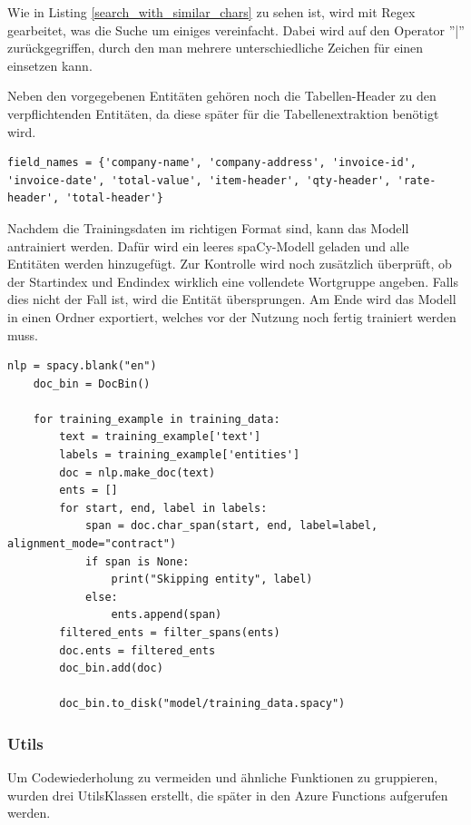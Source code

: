 Wie in Listing \ref{search_with_similar_chars} zu sehen ist, wird mit Regex gearbeitet, was die Suche um einiges vereinfacht. Dabei wird auf den Operator ''|'' zurückgegriffen, durch den man mehrere unterschiedliche Zeichen für einen einsetzen kann.

Neben den vorgegebenen Entitäten gehören noch die Tabellen-Header zu den verpflichtenden Entitäten, da diese später für die Tabellenextraktion benötigt wird. 

\begin{lstlisting}[caption={Verpflichtende Entitäten}]
    field_names = {'company-name', 'company-address', 'invoice-id', 'invoice-date', 'total-value', 'item-header', 'qty-header', 'rate-header', 'total-header'}
\end{lstlisting}

Nachdem die Trainingsdaten im richtigen Format sind, kann das Modell antrainiert werden. Dafür wird ein leeres spaCy-Modell geladen und alle Entitäten werden hinzugefügt. Zur Kontrolle wird noch zusätzlich überprüft, ob der Startindex und Endindex wirklich eine vollendete Wortgruppe angeben. Falls dies nicht der Fall ist, wird die Entität übersprungen. Am Ende wird das Modell in einen Ordner exportiert, welches vor der Nutzung noch fertig trainiert werden muss.

\begin{lstlisting}[caption={Trainieren vom Modell}]
    nlp = spacy.blank("en")
    doc_bin = DocBin() 

    for training_example in training_data: 
        text = training_example['text']
        labels = training_example['entities']
        doc = nlp.make_doc(text) 
        ents = []
        for start, end, label in labels:
            span = doc.char_span(start, end, label=label, alignment_mode="contract")
            if span is None:
                print("Skipping entity", label)
            else:
                ents.append(span)
        filtered_ents = filter_spans(ents)
        doc.ents = filtered_ents 
        doc_bin.add(doc)

        doc_bin.to_disk("model/training_data.spacy")
\end{lstlisting}

\subsubsection{Utils}

Um Codewiederholung zu vermeiden und ähnliche Funktionen zu gruppieren, wurden drei UtilsKlassen erstellt, die später in den Azure Functions aufgerufen werden.

